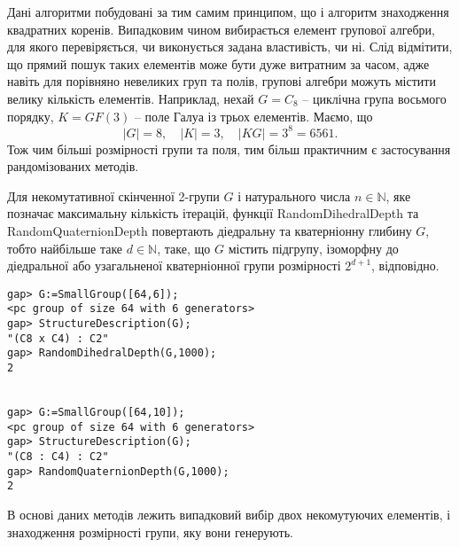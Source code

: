 Дані алгоритми побудовані за тим самим принципом, що і алгоритм знаходження квадратних коренів. Випадковим чином вибирається елемент групової алгебри, для якого перевіряється, чи виконується задана властивість, чи ні. Слід відмітити, що прямий пошук таких елементів може бути дуже витратним за часом, адже навіть для порівняно невеликих груп та полів, групові алгебри можуть містити велику кількість елементів. Наприклад, нехай $G=C_8$ -- циклічна група восьмого порядку, $K=GF(3)$ -- поле Галуа із трьох елементів. Маємо, що
\[
|G| = 8, \quad |K| = 3, \quad |KG| = 3^8 = 6561.
\]
Тож чим більші розмірності групи та поля, тим більш практичним є застосування рандомізованих методів.

Для некомутативної скінченної 2-групи $G$ і натурального числа $n \in \mathbb{N}$, яке позначає максимальну кількість ітерацій, функції \textsf{RandomDihedralDepth} та  \textsf{RandomQuaternionDepth} повертають діедральну та кватерніонну глибину $G$, тобто найбільше таке $d \in \mathbb{N}$, таке, що $G$ містить підгрупу, ізоморфну до діедральної або узагальненої кватерніонної групи розмірності $2^{d+1}$, відповідно.

\begin{lstlisting}[label=units,caption=Рандомізована діедральна та кватерніонна глибина]
gap> G:=SmallGroup([64,6]);
<pc group of size 64 with 6 generators>
gap> StructureDescription(G);
"(C8 x C4) : C2"
gap> RandomDihedralDepth(G,1000);
2


gap> G:=SmallGroup([64,10]);
<pc group of size 64 with 6 generators>
gap> StructureDescription(G);
"(C8 : C4) : C2"
gap> RandomQuaternionDepth(G,1000);
2
\end{lstlisting}

В основі даних методів лежить випадковий вибір двох некомутуючих елементів, і знаходження розмірності групи, яку вони генерують.